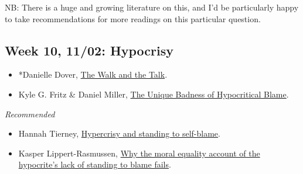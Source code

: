 \documentclass[
]{article}
\providecommand{\tightlist}{%
  \setlength{\itemsep}{0pt}\setlength{\parskip}{0pt}}
\begin{document}
NB: There is a huge and growing literature on this, and I'd be
particularly happy to take recommendations for more readings on this
particular question.

\hypertarget{week-10-1102-hypocrisy}{%
\subsection{Week 10, 11/02: Hypocrisy}\label{week-10-1102-hypocrisy}}

\begin{itemize}
\tightlist
\item
  *Danielle Dover, \href{https://doi.org/10.1215/00318108-7697850}{The
  Walk and the Talk}.
\item
  Kyle G. Fritz \& Daniel Miller,
  \href{https://quod.lib.umich.edu/e/ergo/12405314.0006.019/--unique-badness-of-hypocritical-blame?rgn=main;view=fulltext}{The
  Unique Badness of Hypocritical Blame}.
\end{itemize}

\emph{Recommended}

\begin{itemize}
\tightlist
\item
  Hannah Tierney,
  \href{https://doi.org/10.1093/analys/anaa074}{Hypercrisy and standing
  to self-blame}.
\item
  Kasper Lippert-Rasmussen,
  \href{https://doi.org/10.1093/analys/anaa009}{Why the moral equality
  account of the hypocrite's lack of standing to blame fails}.
\end{itemize}
\end{document}
